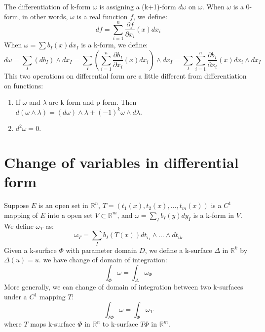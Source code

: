 The differentiation of k-form $\omega$ is assigning a (k+1)-form $d\omega$ on $\omega$. When $\omega$ is a 0-form, in other words, $\omega$ is a real function $f$, we define:
\begin{equation*}
    df=\sum_{i=1}^n\frac{\partial f}{\partial x_i}(x)dx_i
\end{equation*}
When $\omega=\sum b_I(x)dx_I$ is a k-form, we define:
\begin{equation*}
    d\omega=\sum_I (db_I)\wedge dx_I=\sum_I (\sum_{i=1}^n\frac{\partial b_I}{\partial x_i}(x)dx_i)\wedge dx_I=\sum_I \sum_{i=1}^n\frac{\partial b_I}{\partial x_i}(x)dx_i\wedge dx_I
\end{equation*}
This two operations on differential form are a little different from differentiation on functions:
\begin{enumerate}
    \item If $\omega$ and $\lambda$ are k-form and p-form. Then $d(\omega\wedge\lambda)=(d\omega)\wedge\lambda+(-1)^k \omega\wedge d\lambda$.
    \item $d^2\omega=0$.
\end{enumerate}
\section{Change of variables in differential form}
Suppose $E$ is an open set in $\mathbb{R}^n$, $T=(t_1(x),t_2(x),\dots,t_m(x))$ is a $C^1$ mapping of $E$ into a open set $V\subset \mathbb{R}^m$, and $\omega=\sum_I b_I(y)dy_I$ is a k-form in $V$. We define $\omega_T$ as:
\begin{equation*}
    \omega_T=\sum_I b_I(T(x))dt_{i_1}\wedge\dots\wedge dt_{ik}
\end{equation*}
Given a k-surface $\Phi$ with parameter domain $D$, we define a k-surface $\Delta$ in $\mathbb{R}^k$ by $\Delta(u)=u$. we have change of domain of integration:
\begin{equation*}
    \int_{\Phi}{\omega}=\int_{\Delta}{\omega_\Phi}
\end{equation*}
More generally, we can change of domain of integration between two k-surfaces under a $C^1$ mapping $T$:
\begin{equation*}
    \int_{T\Phi}{\omega}=\int_{\Phi}{\omega_T}
\end{equation*}
where $T$ maps k-surface $\Phi$ in $\mathbb{R}^n$ to k-surface $T\Phi$ in $\mathbb{R}^m$.
